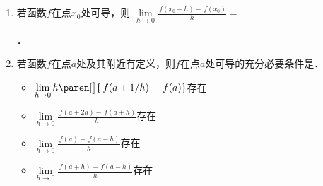 \documentclass[a4paper,punct=CCT]{ctexbook}
\theoremstyle{definition}
\theoremstyle{remark}
\newif\ifshowsol
\begin{document}
\begin{enumerate}
  \ifshowsol
  注意到
  \begin{equation}
    \lim_{h\to0} \frac{\,f(h^2)}{h^2} = \!\lim_{\,x\to0^+\!} \!\frac{\,f(x)}{x} = 1.
    \label{eq:B1.4.1.E8}
  \end{equation}
  因为函数连续，所以\(\!\lim\limits_{x\to0^+} f(x) = \,f(0)\)．如果\(\,f(0) \ne 0\)，那么式~\eqref{eq:B1.4.1.E8}中的极限发散．自相矛盾，所以~\(\,f(0) = 0\)．从而有
  \begin{equation*}
    f'_+(0)
    = \!\lim_{\,x\to0^+\!} \!\frac{\,f(x)}{x} = 1.
  \end{equation*}
  \fi

\item 若函数\(f\)在点\(x_0\)处可导，则
  \begin{math}
    \lim\limits_{h\to0} \frac{\,f(x_0-h) - \,f(x_0)}{h} =
  \end{math}
  \ifshowsol
  {\setlength{\ULdepth}{.9ex}%
    \uline{\makebox[6em]{\(-\,f'(x_0)\)}}}．

  根据定理~\ref{thm:limfunccomp}，有
  \begin{equation*}
    \lim_{h\to0} \frac{\,f(x_0-h) - \,f(x_0)}{h}
    = - \lim_{h\to0} \frac{\,f(x_0-h) - \,f(x_0)}{-h}
    = - \lim_{\fdx\to0} \frac{\,f(x_0+\fdx) - \,f(x_0)}{\fdx}
    = - \,f'(x_0).
  \end{equation*}
  \else
  \uline{\hspace{6em}}．
  \fi

\item 若函数\(f\)在点\(a\)处及其附近有定义，则\(f\)在点\(a\)处可导的充分必要条件是\uline{\hfill}．
  \begin{itemize}
    \renewcommand{\labelitemi}{\faCircleThin}
  \item \(\lim\limits_{h\to0} h\paren[\big]{\,f(a+1/h) - \,f(a)}\)存在
  \item \(\lim\limits_{h\to0} \frac{\,f(a+2h) - \,f(a+h)}{h}\)存在
    \ifshowsol
  \item[\faCircle]
    \else
  \item
    \fi
    \(\lim\limits_{h\to0} \frac{\,f(a) - \,f(a-h)}{h}\)存在
  \item \(\lim\limits_{h\to0} \frac{\,f(a+h) - \,f(a-h)}{h}\)存在
  \end{itemize}

  \ifshowsol
  令\(\,f(x) = \abs x,\ a = 0\)．这就是选项~B和~D的共同反例．实际上，选项~B和~D只是必要不充分条件．选项~A即不充分也不必要．函数\(\arctan\abs x\)说明了不充分性，函数\(x^2\)说明了不必要性．关于选项~C，有
  \begin{equation*}
    \lim_{h\to0} \frac{\,f(a) - \,f(a-h)}{h}
    = \lim_{h\to0} \frac{\,f(a-h) - \,f(a)}{-h}
    = \lim_{\fdx\to0} \frac{\,f(a+\fdx) - \,f(a)}{\fdx}
    = \,f'(a).
  \end{equation*}
  \fi


\end{enumerate}
\end{document}
